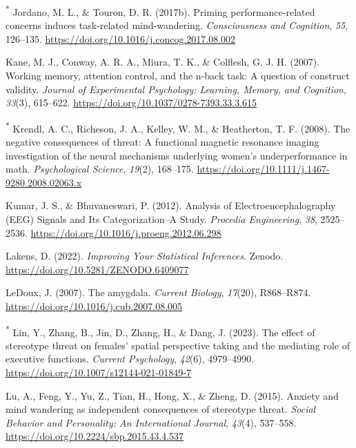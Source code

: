 \documentclass[
  stu, a4paper,floatsintext]{apa7}
\newlength{\cslhangindent}
\newenvironment{CSLReferences}[2] %
 {\begin{list}{}{%
  \setlength{\itemindent}{0pt}
  \setlength{\leftmargin}{0pt}
  \setlength{\parsep}{0pt}
  \ifodd #1
   \setlength{\leftmargin}{\cslhangindent}
   \setlength{\itemindent}{-1\cslhangindent}
  \fi
  \setlength{\itemsep}{#2\baselineskip}}}
 {\end{list}}
\begin{document}
\begin{CSLReferences}{1}{0}
\textsuperscript{*} Jordano, M. L., \& Touron, D. R. (2017b). Priming performance-related concerns induces task-related mind-wandering. \emph{Consciousness and Cognition}, \emph{55}, 126--135. \url{https://doi.org/10.1016/j.concog.2017.08.002}

Kane, M. J., Conway, A. R. A., Miura, T. K., \& Colflesh, G. J. H. (2007). Working memory, attention control, and the n-back task: {A} question of construct validity. \emph{Journal of Experimental Psychology: Learning, Memory, and Cognition}, \emph{33}(3), 615--622. \url{https://doi.org/10.1037/0278-7393.33.3.615}

\textsuperscript{*} Krendl, A. C., Richeson, J. A., Kelley, W. M., \& Heatherton, T. F. (2008). The negative consequences of threat: A functional magnetic resonance imaging investigation of the neural mechanisms underlying women's underperformance in math. \emph{Psychological Science}, \emph{19}(2), 168--175. \url{https://doi.org/10.1111/j.1467-9280.2008.02063.x}

Kumar, J. S., \& Bhuvaneswari, P. (2012). Analysis of {Electroencephalography} ({EEG}) {Signals} and {Its Categorization}--{A Study}. \emph{Procedia Engineering}, \emph{38}, 2525--2536. \url{https://doi.org/10.1016/j.proeng.2012.06.298}

Lakens, D. (2022). \emph{Improving {Your Statistical Inferences}}. Zenodo. \url{https://doi.org/10.5281/ZENODO.6409077}

LeDoux, J. (2007). The amygdala. \emph{Current Biology}, \emph{17}(20), R868--R874. \url{https://doi.org/10.1016/j.cub.2007.08.005}

\textsuperscript{*} Lin, Y., Zhang, B., Jin, D., Zhang, H., \& Dang, J. (2023). The effect of stereotype threat on females' spatial perspective taking and the mediating role of executive functions. \emph{Current Psychology}, \emph{42}(6), 4979--4990. \url{https://doi.org/10.1007/s12144-021-01849-7}

Lu, A., Feng, Y., Yu, Z., Tian, H., Hong, X., \& Zheng, D. (2015). Anxiety and mind wandering as independent consequences of stereotype threat. \emph{Social Behavior and Personality: An International Journal}, \emph{43}(4), 537--558. \url{https://doi.org/10.2224/sbp.2015.43.4.537}


\end{CSLReferences}
\end{document}
